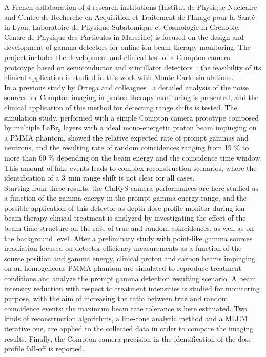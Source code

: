 A French collaboration of 4 research institutions (Institut de Physique Nucleaire and Centre de Recherche en Acquisition et Traitement de l'Image pour la Sant\'e in Lyon, Laboratoire de Physique Subatomique et Cosmologie in Grenoble, Centre de Physique des Particules in Marseille) is focused on the design and development of gamma detectors for online ion beam therapy monitoring. The project includes the development and clinical test of a Compton camera prototype based on semiconductor and scintillator detectors~\cite{krimmer:hal-01101334}; the feasibility of its clinical application is studied in this work with Monte Carlo simulations.\\ 
In a previous study by Ortega and colleagues~\cite{Ortega:2015aa} a detailed analysis of the noise sources for Compton imaging in proton therapy monitoring is presented, and the clinical application of this method for detecting range shifts is tested. The simulation study, performed with a simple Compton camera prototype composed by multiple LaBr$_3$ layers with a ideal mono-energetic proton beam impinging on a PMMA phantom, showed the relative expected rate of prompt gammas and neutrons, and the resulting rate of random coincidences ranging from 19 \% to more than 60 \% depending on the beam energy and the coincidence time window. This amount of fake events leads to complex reconstruction scenarios, where the identification of a 3~mm range shift is not clear for all cases.\\    
Starting from these results, the ClaRyS camera performances are here studied as a function of the gamma energy in the prompt gamma energy range, and the possible application of this detector as depth-dose profile monitor during ion beam therapy clinical treatment is analyzed by investigating the effect of the beam time structure on the rate of true and random coincidences, as well as on the background level. After a preliminary study with point-like gamma sources irradiation focused on detector efficiency measurements as a function of the source position and gamma energy, clinical proton and carbon beams impinging on an homogeneous PMMA phantom are simulated to reproduce treatment conditions and analyze the prompt gamma detection resulting scenario. A beam intensity reduction with respect to treatment intensities is studied for monitoring purpose, with the aim of increasing the ratio between true and random coincidence events: the maximum beam rate tolerance is here estimated. Two kinds of reconstruction algorithms, a line-cone analytic method and a MLEM iterative one, are applied to the collected data in order to compare the imaging results. Finally, the Compton camera precision in the identification of the dose profile fall-off is reported.   
